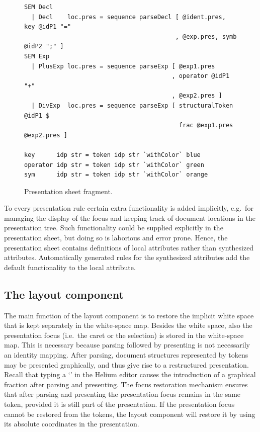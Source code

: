 \documentclass[12pt]{article}
\begin{document}
\begin{figure}
\begin{center}
\begin{footnotesize}
\begin{verbatim}
SEM Decl
  | Decl    loc.pres = sequence parseDecl [ @ident.pres, key @idP1 "="
                                          , @exp.pres, symb @idP2 ";" ]
SEM Exp
  | PlusExp loc.pres = sequence parseExp [ @exp1.pres
                                         , operator @idP1 "+"
                                         , @exp2.pres ]
  | DivExp  loc.pres = sequence parseExp [ structuralToken @idP1 $ 
                                           frac @exp1.pres @exp2.pres ]
                  
key      idp str = token idp str `withColor` blue
operator idp str = token idp str `withColor` green
sym      idp str = token idp str `withColor` orange
\end{verbatim}%
\end{footnotesize}
\caption{Presentation sheet fragment.} \label{fig:presentationSheet} 
\end{center}
\end{figure}

\bc  
To every presentation rule certain extra functionality is added implicitly, e.g.\ for managing the display of the focus and keeping track of document locations in the presentation tree. Such functionality could be supplied explicitly in the presentation sheet, but doing so is laborious and error prone. Hence, the presentation sheet contains definitions of local attributes  rather than synthesized attributes. Automatically generated rules for the synthesized  attributes add the default functionality to the local attribute.
\ec

\subsection{The layout component}

The main function of the layout component is to restore the implicit white space that is kept separately in the white-space map. Besides the white space, also the presentation focus (i.e.\ the caret or the selection) is stored in the white-space map. This is necessary because parsing followed by presenting is not necessarily an identity mapping. After parsing, document structures represented by tokens may be presented graphically, and thus give rise to a restructured presentation. Recall that typing a `\p{/}' in the Helium editor causes the introduction of a graphical fraction after parsing and presenting. The focus restoration mechanism ensures that after parsing and presenting the presentation focus remains in the same token, provided it is still part of the presentation. If the presentation focus cannot be restored from the tokens, the layout component will restore it by using its absolute coordinates in the presentation.
\end{document}
